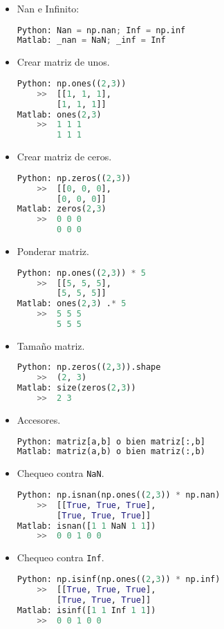 \documentclass[letterpaper,11pt]{article} %
\begin{document}
\begin{itemize}
	
\item{
Nan e Infinito:
\begin{lstlisting}[language=Python]
Python: Nan = np.nan; Inf = np.inf
Matlab: _nan = NaN; _inf = Inf
\end{lstlisting}
}
	
\item{
Crear matriz de unos.
\begin{lstlisting}[language=Python]
Python: np.ones((2,3))
	>>	[[1, 1, 1],
		[1, 1, 1]]
Matlab: ones(2,3)
	>>	1 1 1
		1 1 1
\end{lstlisting}
}
	
\newpage
\item{
Crear matriz de ceros.
\begin{lstlisting}[language=Python]
Python: np.zeros((2,3))
	>>	[[0, 0, 0],
		[0, 0, 0]]
Matlab: zeros(2,3)
	>>	0 0 0
		0 0 0
\end{lstlisting}
}
	
\item{
Ponderar matriz.
\begin{lstlisting}[language=Python]
Python: np.ones((2,3)) * 5
	>>	[[5, 5, 5],
		[5, 5, 5]]
Matlab: ones(2,3) .* 5
	>>	5 5 5
		5 5 5
\end{lstlisting}
}
	
\item{
Tamaño matriz.
\begin{lstlisting}[language=Python]
Python: np.zeros((2,3)).shape
	>>	(2, 3)
Matlab: size(zeros(2,3))
	>>	2 3
\end{lstlisting}
}

\item{
Accesores.
\begin{lstlisting}[language=Python]
Python: matriz[a,b] o bien matriz[:,b]
Matlab: matriz(a,b) o bien matriz(:,b)
\end{lstlisting}
}

\item{
Chequeo contra \texttt{NaN}.
\begin{lstlisting}[language=Python]
Python: np.isnan(np.ones((2,3)) * np.nan)
	>>	[[True, True, True],
		[True, True, True]]
Matlab: isnan([1 1 NaN 1 1])
	>>	0 0 1 0 0
\end{lstlisting}
}

\item{
Chequeo contra \texttt{Inf}.
\begin{lstlisting}[language=Python]
Python: np.isinf(np.ones((2,3)) * np.inf)
	>>	[[True, True, True],
		[True, True, True]]
Matlab: isinf([1 1 Inf 1 1])
	>>	0 0 1 0 0
\end{lstlisting}
}


\end{itemize}
\end{document}
